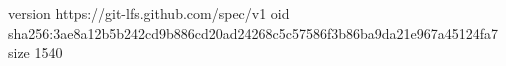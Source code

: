 version https://git-lfs.github.com/spec/v1
oid sha256:3ae8a12b5b242cd9b886cd20ad24268c5c57586f3b86ba9da21e967a45124fa7
size 1540
